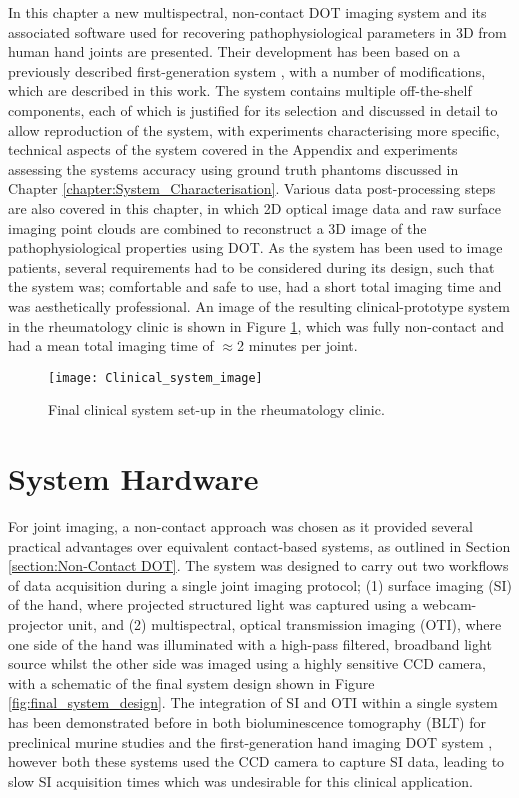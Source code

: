 \documentclass[twoside]{bhamthesis}
\theoremstyle{definition}
\begin{document}
In this chapter a new multispectral, non-contact DOT imaging system and its associated software used for recovering pathophysiological parameters in 3D from human hand joints are presented. Their development has been based on a previously described first-generation system \cite{wu2016development}, with a number of modifications, which are described in this work. The system contains multiple off-the-shelf components, each of which is justified for its selection and discussed in detail to allow reproduction of the system, with experiments characterising more specific, technical aspects of the system covered in the Appendix and experiments assessing the systems accuracy using ground truth phantoms discussed in Chapter \ref{chapter:System_Characterisation}. Various data post-processing steps are also covered in this chapter, in which 2D optical image data and raw surface imaging point clouds are combined to reconstruct a 3D image of the pathophysiological properties using DOT. As the system has been used to image patients, several requirements had to be considered during its design, such that the system was; comfortable and safe to use, had a short total imaging time and was aesthetically professional. An image of the resulting clinical-prototype system in the rheumatology clinic is shown in Figure \ref{fig:Clinical_system_image}, which was fully non-contact and had a mean total imaging time of $\approx$2 minutes per joint. 

\begin{figure}[!ht]
\centering
  \texttt{[image: Clinical\_system\_image]}
\caption{Final clinical system set-up in the rheumatology clinic.}
  \label{fig:Clinical_system_image}
\end{figure}

\section{System Hardware}

For joint imaging, a non-contact approach was chosen as it provided several practical advantages over equivalent contact-based systems, as outlined in Section \ref{section:Non-Contact DOT}. The system was designed to carry out two workflows of data acquisition during a single joint imaging protocol; (1) surface imaging (SI) of the hand, where projected structured light was captured using a webcam-projector unit, and (2) multispectral, optical transmission imaging (OTI), where one side of the hand was illuminated with a high-pass filtered, broadband light source whilst the other side was imaged using a highly sensitive CCD camera, with a schematic of the final system design shown in Figure \ref{fig:final_system_design}. The integration of SI and OTI within a single system has been demonstrated before in both bioluminescence tomography (BLT) for preclinical murine studies \cite{guggenheim2013multi} and the first-generation hand imaging DOT system \cite{wu2016development}, however both these systems used the CCD camera to capture SI data, leading to slow SI acquisition times which was undesirable for this clinical application.
\end{document}
